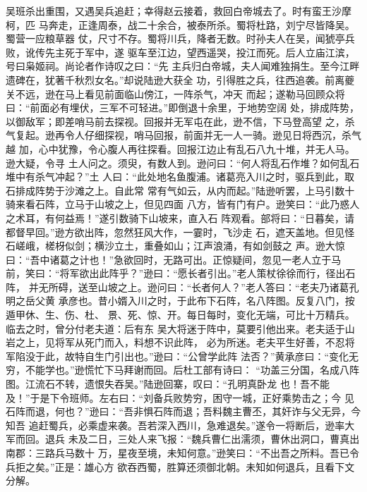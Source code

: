 吴班杀出重围，又遇吴兵追赶；幸得赵云接着，救回白帝城去了。时有蛮王沙摩柯，匹
马奔走，正逢周泰，战二十余合，被泰所杀。蜀将杜路，刘宁尽皆降吴。蜀营一应粮草器
仗，尺寸不存。蜀将川兵，降者无数。时孙夫人在吴，闻猇亭兵败，讹传先主死于军中，遂
驱车至江边，望西遥哭，投江而死。后人立庙江滨，号曰枭姬祠。尚论者作诗叹之曰：“先
主兵归白帝城，夫人闻难独捐生。至今江畔遗碑在，犹著千秋烈女名。”却说陆逊大获全
功，引得胜之兵，往西追袭。前离夔关不远，逊在马上看见前面临山傍江，一阵杀气，冲天
而起；遂勒马回顾众将曰：“前面必有埋伏，三军不可轻进。”即倒退十余里，于地势空阔
处，排成阵势，以御敌军；即差哨马前去探视。回报并无军屯在此，逊不信，下马登高望
之，杀气复起。逊再令人仔细探视，哨马回报，前面并无一人一骑。逊见日将西沉，杀气越
加，心中犹豫，令心腹人再往探看。回报江边止有乱石八九十堆，并无人马。逊大疑，令寻
土人问之。须臾，有数人到。逊问曰：“何人将乱石作堆？如何乱石堆中有杀气冲起？”土
人曰：“此处地名鱼腹浦。诸葛亮入川之时，驱兵到此，取石排成阵势于沙滩之上。自此常
常有气如云，从内而起。”陆逊听罢，上马引数十骑来看石阵，立马于山坡之上，但见四面
八方，皆有门有户。逊笑曰：“此乃惑人之术耳，有何益焉！”遂引数骑下山坡来，直入石
阵观看。部将曰：“日暮矣，请都督早回。”逊方欲出阵，忽然狂风大作，一霎时，飞沙走
石，遮天盖地。但见怪石嵯峨，槎枒似剑；横沙立土，重叠如山；江声浪涌，有如剑鼓之
声。逊大惊曰：“吾中诸葛之计也！”急欲回时，无路可出。正惊疑间，忽见一老人立于马
前，笑曰：“将军欲出此阵乎？”逊曰：“愿长者引出。”老人策杖徐徐而行，径出石阵，
并无所碍，送至山坡之上。逊问曰：“长者何人？”老人答曰：“老夫乃诸葛孔明之岳父黄
承彦也。昔小婿入川之时，于此布下石阵，名八阵图。反复八门，按遁甲休、生、伤、杜、
景、死、惊、开。每日每时，变化无端，可比十万精兵。临去之时，曾分付老夫道：后有东
吴大将迷于阵中，莫要引他出来。老夫适于山岩之上，见将军从死门而入，料想不识此阵，
必为所迷。老夫平生好善，不忍将军陷没于此，故特自生门引出也。”逊曰：“公曾学此阵
法否？”黄承彦曰：“变化无穷，不能学也。”逊慌忙下马拜谢而回。后杜工部有诗曰：
“功盖三分国，名成八阵图。江流石不转，遗恨失吞吴。”陆逊回寨，叹曰：“孔明真卧龙
也！吾不能及！”于是下令班师。左右曰：“刘备兵败势穷，困守一城，正好乘势击之；今
见石阵而退，何也？”逊曰：“吾非惧石阵而退；吾料魏主曹丕，其奸诈与父无异，今知吾
追赶蜀兵，必乘虚来袭。吾若深入西川，急难退矣。”遂令一将断后，逊率大军而回。退兵
未及二日，三处人来飞报：“魏兵曹仁出濡须，曹休出洞口，曹真出南郡：三路兵马数十
万，星夜至境，未知何意。”逊笑曰：“不出吾之所料。吾已令兵拒之矣。”正是：雄心方
欲吞西蜀，胜算还须御北朝。未知如何退兵，且看下文分解。